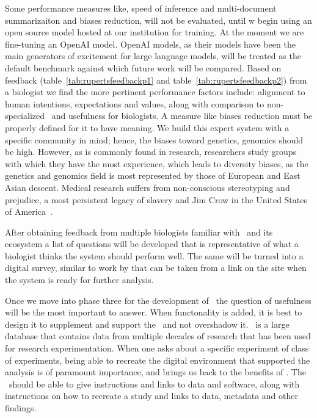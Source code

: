 Some performance measures like, speed of inference and multi-document summarizaiton and biases reduction, will not be evaluated, until w begin using an open source model hosted at our institution for training.
At the moment we are fine-tuning an OpenAI model.
OpenAI models, as their models have been the main generators of excitement for large language models, will be treated as the default benchmark against which future work will be compared.
Based on feedback (table~\ref{tab:rupertsfeedbackp1} and table~\ref{tab:rupertsfeedbackp2}) from a biologist we find the more pertinent performance factors include: alignment to human intentions, expectations and values, along with comparison to non-specialized \llms\, and usefulness for biologists.
A measure like biases reduction must be properly defined for it to have meaning.
We build this expert system with a specific community in mind; hence, the biases toward genetics, genomics should be high.
However, as is commonly found in research, researchers study groups with which they have the most experience, which leads to diversity biases, as the genetics and genomics field is most represented by those of European and East Asian descent.
Medical research suffers from non-conscious stereotyping and prejudice, a most persistent legacy of slavery and Jim Crow in the United States of America~\cite{Stone:2011}.
    

After obtaining feedback from multiple biologists familiar with \GN\ and its ecosystem a list of questions will be developed that is representative of what a biologist thinks the system should perform well. 
The same will be turned into a digital survey, similar to work by \cite{Blattgerste:2022} that can be taken from a link on the site when the system is ready for further analysis.

Once we move into phase three for the development of \project\ the question of usefulness will be the most important to answer.
When functonality is added, it is best to design it to supplement and support the \project\ and not overshadow it.
\GN\ is a large database that contains data from multiple decades of research that has been used for research experimentation.
When one asks about a specific experiment of class of experiments, being able to recreate the digital environment that supported the analysis is of paramount importance, and brings us back to the benefits of \guix.
The \project\ should be able to give instructions and links to data and software, along with instructions on how to recreate a study and links to data, metadata and other findings.

